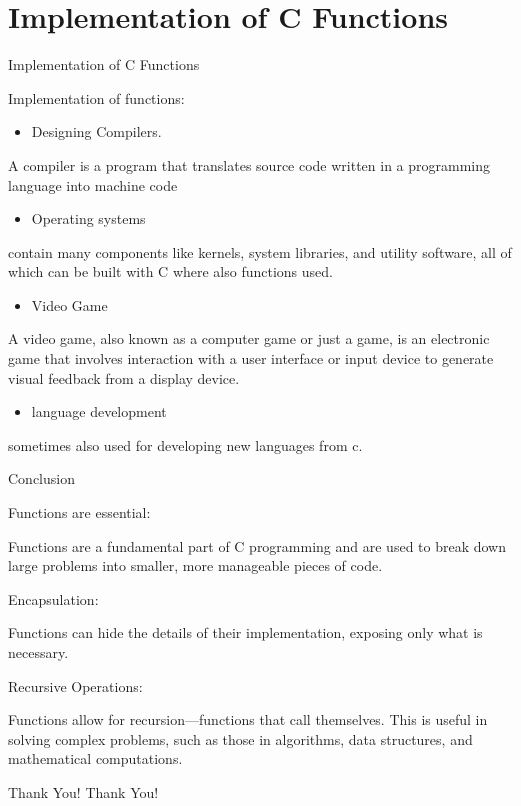 \documentclass{beamer}
\begin{document}
\section{Implementation of C Functions}
\begin{frame}[fragile]{Implementation of C Functions}

   {\color{orange}\Large Implementation of functions:} 
	\begin{itemize}
	    \item Designing Compilers.
	\end{itemize}		
			 A compiler is a program that translates source
			 code written in a programming language into machine code 
    \begin{itemize}
	    \item Operating systems
	\end{itemize}
			
			
 			contain many components like kernels, system libraries, and utility software, 
			all of which can be built with C where also functions used.
   \begin{itemize}
	    \item Video Game
	\end{itemize}
		
			A video game, also known as a computer game or just a game, is an electronic game 
			that involves interaction with a user interface or input device to generate visual
			feedback from a display device.
				\begin{itemize}
	    \item language development
	\end{itemize}
			sometimes also used for developing new languages from c.

 
\end{frame}


\begin{frame}{Conclusion}
    \begin{itemize}
       {\color{orange} \item Functions are essential:} Functions are a fundamental part of C programming and are used to break down large problems into smaller, more manageable pieces of code.
       {\color{orange} \item Encapsulation:} Functions can hide the details of their implementation, exposing only what is necessary.
        {\color{orange}\item Recursive Operations:} Functions allow for recursion—functions that call themselves. This is useful in solving complex problems, such as those in algorithms, data structures, and mathematical computations.
    \end{itemize}
\end{frame}


\begin{frame}{Thank You!}
    \centering
    Thank You! 
\end{frame}
\end{document}
